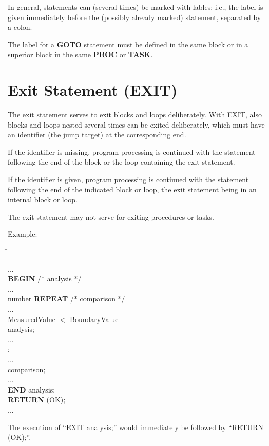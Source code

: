 In general, statements can (several times) be marked with lables; i.e.,
the label is given immediately before the (possibly already marked)
statement, separated by a colon.

\begin{added}
The label for a {\bf GOTO} statement must be defined in the same block or in a superior block 
in the same {\bf PROC} or {\bf TASK}.
\end{added}

\section{Exit Statement (EXIT)}    %

The exit statement serves to exit blocks and loops deliberately. With
EXIT, also blocks and loops nested several times can be exited
deliberately, which must have an identifier (the jump target) at the
corresponding end.



If the identifier is missing, program processing is continued with the
statement following the end of the block or the loop containing the exit
statement.

If the identifier is given, program processing is continued with the
statement following the end of the indicated block or loop, the exit
statement being in an internal block or loop.

The exit statement may not serve for exiting procedures or tasks.

Example:

\begin{tabbing}
\hspace*{7cm} \= \kill

... \> \\
{\bf BEGIN} \> /* analysis */ \\
\x ... \> \\
 number {\bf REPEAT} \> /* comparison */ \\
\x \x ... \> \\
\x {} MeasuredValue $<$ BoundaryValue \> \\
\x {} analysis; \> \\
\x {} ... \> \\
\x {}; \> \\
\x \x ... \> \\
 comparison; \> \\
\x ... \> \\
{\bf END} analysis; \> \\
{\bf RETURN} (OK);\> \\
\x ... \>
\end{tabbing}

The execution of ``EXIT analysis;'' would immediately be followed by
``RETURN (OK);''.

